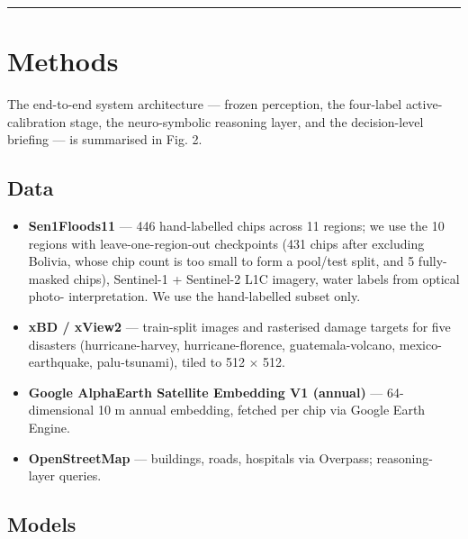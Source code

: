 \begin{center}\rule{0.5\linewidth}{0.5pt}\end{center}

\section{Methods}\label{methods}

The end-to-end system architecture --- frozen perception, the four-label
active-calibration stage, the neuro-symbolic reasoning layer, and the
decision-level briefing --- is summarised in Fig. 2.

\subsection{Data}\label{data}

\begin{itemize}
\tightlist
\item
  \textbf{Sen1Floods11} \cite{bonafilia2020sen1floods11} --- 446 hand-labelled chips across 11
  regions; we use the 10 regions with leave-one-region-out checkpoints
  (431 chips after excluding Bolivia, whose chip count is too small to
  form a pool/test split, and 5 fully-masked chips),
  Sentinel-1 + Sentinel-2 L1C imagery, water labels from optical photo-
  interpretation. We use the hand-labelled subset only.
\item
  \textbf{xBD / xView2} \cite{gupta2019xbd} --- train-split images and rasterised damage
  targets for five disasters (hurricane-harvey, hurricane-florence,
  guatemala-volcano, mexico-earthquake, palu-tsunami), tiled to 512 $\times$ 512.
\item
  \textbf{Google AlphaEarth Satellite Embedding V1 (annual)} --- 64-dimensional
  10 m annual embedding, fetched per chip via Google Earth Engine.
\item
  \textbf{OpenStreetMap} --- buildings, roads, hospitals via Overpass; reasoning-
  layer queries.
\end{itemize}

\subsection{Models}\label{models}

